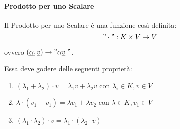 \paragraph{Prodotto per uno Scalare}
Il Prodotto per uno Scalare è una funzione così definita:
\["\cdot" : K \times V \to V \]
\begin{center}
    ovvero $(\underline{\alpha}, \underline{v} ) \to "\alpha\underline{v}\;"$.
\end{center}
Essa deve godere delle seguenti proprietà:
\begin{enumerate}
    \item $(\lambda_1 + \lambda_2) \cdot \underline{v} = \lambda_1\underline{v} + \lambda_2 \underline{v}$ con $\lambda_i \in K, \underline{v} \in V$
    \item $\lambda \cdot (\underline{v_1} + \underline{v_1}) = \lambda\underline{v_1} + \lambda\underline{v_2}$ con $\lambda \in K, \underline{v_1} \in V$
    \item $(\lambda_1 \cdot \lambda_2) \cdot \underline{v} = \lambda_1 \cdot (\lambda_2 \cdot \underline{v})$
\end{enumerate}

